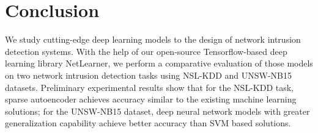 \section{Conclusion}
We study cutting-edge deep learning models to the design of network intrusion detection systems.
With the help of our open-source Tensorflow-based deep learning library NetLearner, we perform a comparative evaluation of those models on two network intrusion detection tasks using NSL-KDD and UNSW-NB15 datasets. Preliminary experimental results show that for the NSL-KDD task, sparse autoencoder achieves accuracy similar to the existing machine learning solutions; for the UNSW-NB15 dataset, deep neural network models with greater generalization capability achieve better accuracy than SVM based solutions.